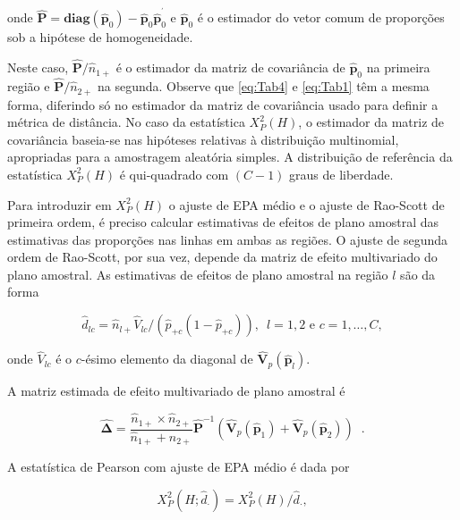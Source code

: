 \documentclass[]{book}
\theoremstyle{definition}
\theoremstyle{definition}
\theoremstyle{definition}
\theoremstyle{remark}
\begin{document}
onde
\(\mathbf{\hat{P}=diag}\left( \mathbf{\hat{p}}_{0}\right) -\mathbf{\hat{p }}_{0}\mathbf{\hat{p}}_{0}^{^{\prime }}\)
e \(\mathbf{\hat{p}}_{0}\) é o estimador do vetor comum de proporções
sob a hipótese de homogeneidade.

Neste caso, \(\mathbf{\hat{P}}/\widehat{n}_{1+}\) é o estimador da
matriz de covariância de \(\mathbf{\hat{p}}_{0}\) na primeira região e
\(\mathbf{\hat{P}}/\widehat{n}_{2+}\) na segunda. Observe que
\eqref{eq:Tab4} e \eqref{eq:Tab1} têm a mesma forma, diferindo só no
estimador da matriz de covariância usado para definir a métrica de
distância. No caso da estatística \(X_{P}^{2}\left( H\right)\), o
estimador da matriz de covariância baseia-se nas hipóteses relativas à
distribuição multinomial, apropriadas para a amostragem aleatória
simples. A distribuição de referência da estatística
\(X_{P}^{2}\left( H\right)\) é qui-quadrado com \(\left( C-1\right)\)
graus de liberdade.

Para introduzir em \(X_{P}^{2}\left( H\right)\) o ajuste de EPA médio e
o ajuste de Rao-Scott de primeira ordem, é preciso calcular estimativas
de efeitos de plano amostral das estimativas das proporções nas linhas
em ambas as regiões. O ajuste de segunda ordem de Rao-Scott, por sua
vez, depende da matriz de efeito multivariado do plano amostral. As
estimativas de efeitos de plano amostral na região \(l\) são da forma

\begin{equation}
\hat{d}_{lc}=\widehat{n}_{l+}\hat{V}_{lc}/\left( \hat{p}_{+c}\left( 1-\hat{p}
_{+c}\right) \right) ,\ \;l=1,2\mbox{ e }c=1,\ldots ,C,  \label{eq:Tab5}
\end{equation}

onde \(\hat{V}_{lc}\) é o \(c\)-ésimo elemento da diagonal de
\(\mathbf{ \hat{V}}_{p}\left( \widehat{\mathbf{p}}_{l}\right)\).

A matriz estimada de efeito multivariado de plano amostral é

\begin{equation}
\mathbf{\hat{\Delta}=}\frac{\widehat{n}_{1+}\times \widehat{n}_{2+}}{
\widehat{n}_{1+}+\widehat{n}_{2+}}\mathbf{\hat{P}}^{-1}\left( \mathbf{\hat{V}
}_{p}\left( \widehat{\mathbf{p}}_{1}\right) +\mathbf{\hat{V}}_{p}\left( 
\widehat{\mathbf{p}}_{2}\right) \right) \;\;.  \label{eq:Tab6}
\end{equation}

A estatística de Pearson com ajuste de EPA médio é dada por

\begin{equation}
X_{P}^{2}\left( H;\hat{d}_{\cdot }\right) =X_{P}^{2}\left( H\right) /\hat{d}
_{\cdot },  \label{eq:Tab7}
\end{equation}
\end{document}
